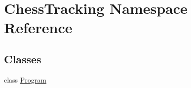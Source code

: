 \hypertarget{namespace_chess_tracking}{}\section{Chess\+Tracking Namespace Reference}
\label{namespace_chess_tracking}
\subsection*{Classes}
\begin{DoxyCompactItemize}
\item 
class \mbox{\hyperlink{class_chess_tracking_1_1_program}{Program}}
\end{DoxyCompactItemize}

